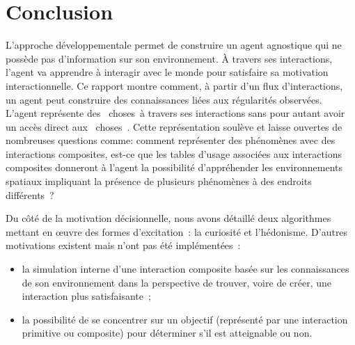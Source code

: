 \documentclass{llncs}
\begin{document}
\section{Conclusion}
L'approche développementale permet de construire un agent agnostique qui ne possède pas d'information sur son environnement. À travers ses interactions, l'agent va apprendre à interagir avec le monde pour satisfaire sa motivation interactionnelle. Ce rapport montre comment, à partir d'un flux d'interactions, un agent peut construire des connaissances liées aux régularités observées. L'agent représente des \og~choses~\fg à travers ses interactions sans pour autant avoir un accès direct aux \og~choses~\fg.
Cette représentation soulève et laisse ouvertes de nombreuses questions comme: comment représenter des phénomènes avec des interactions composites, est-ce que les tables d'usage associées aux interactions composites donneront à l'agent la possibilité d'appréhender les environnements spatiaux impliquant la présence de plusieurs phénomènes à des endroits différents~? 

Du côté de la motivation décisionnelle, nous avons détaillé deux algorithmes mettant en œuvre des formes d'excitation~: la curiosité et l'hédonisme. D'autres motivations existent mais n'ont pas été implémentées~:
\begin{itemize}
	\item la simulation interne d'une interaction composite basée sur les connaissances de son environnement dans la perspective de trouver, voire de créer, une interaction plus satisfaisante~;
	\item la possibilité de se concentrer sur un objectif (représenté par une interaction primitive ou composite) pour déterminer s'il est atteignable ou non.
\end{itemize}



\end{document}

